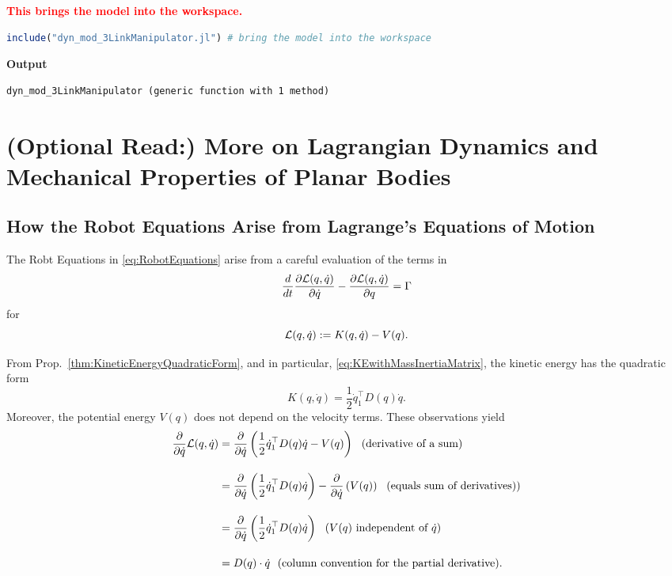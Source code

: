 \bigskip

\textcolor{red}{\bf This brings the model into the workspace. }

\bigskip
\begin{lstlisting}[language=Julia,style=mystyle]
include("dyn_mod_3LinkManipulator.jl") # bring the model into the workspace
\end{lstlisting}
\textbf{Output} 
\begin{verbatim}
dyn_mod_3LinkManipulator (generic function with 1 method)
\end{verbatim}

\section{(Optional Read:) More on Lagrangian Dynamics and Mechanical Properties of Planar Bodies}

\subsection{How the Robot Equations Arise from Lagrange's Equations of Motion}

The Robt Equations in \eqref{eq:RobotEquations} arise from a careful evaluation of the terms in 
$$ \frac{d}{dt} \frac{ \partial {\cal L}(q, \dot{q})}{\partial\dot{q}} - \frac{ \partial {\cal L}(q, \dot{q})}{\partial q} = \Gamma$$
for 
 $$ {\cal L}(q, \dot{q}):= K(q, \dot{q}) - V(q).$$


From Prop.~\ref{thm:KineticEnergyQuadraticForm}, and in particular, \eqref{eq:KEwithMassInertiaMatrix}, the kinetic energy has the quadratic form
$$  K(q, \dot{q}) = \frac{1}{2} \dot{q}_1^\top D(q) \dot{q}.$$
Moreover, the potential energy $V(q)$ does not depend on the velocity terms. These observations yield
\begin{align*}
    \frac{\partial}{\partial \dot{q}} {\cal L}(q, \dot{q})& = \frac{\partial}{\partial \dot{q}}\left( \frac{1}{2} \dot{q}_1^\top D(q) \dot{q} - V(q)  \right) ~~(\text{derivative of a sum})\\[1em]
     &=\frac{\partial}{\partial \dot{q}}\left( \frac{1}{2} \dot{q}_1^\top D(q) \dot{q}\right) - \frac{\partial}{\partial \dot{q}}\left( V(q) \right) ~~(\text{equals sum of derivatives)})\\[1em]
     & = \frac{\partial}{\partial \dot{q}}\left( \frac{1}{2} \dot{q}_1^\top D(q) \dot{q}\right)~~ (V(q) \text{ independent of } \dot{q}) \\[1em]
    &= D(q) \cdot \dot{q} ~~(\text{column convention for the partial derivative)}. \\
\end{align*}

